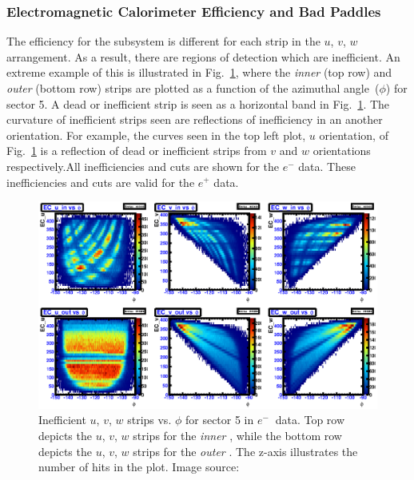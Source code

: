 \subsubsection{\label{sec:calib.ec.eff}Electromagnetic Calorimeter Efficiency and Bad Paddles}
The efficiency for the  subsystem is different for each strip in the $u$, $v$, $w$ arrangement. As a result, there are regions of detection which are inefficient. An extreme example of this is illustrated in Fig.~\ref{fig:neg:ec.sec5}, where the  \emph{inner} (top row) and \emph{outer} (bottom row) strips are plotted as a function of the azimuthal angle~($\phi$) for sector 5. A dead or inefficient strip is seen as a horizontal band in Fig.~\ref{fig:neg:ec.sec5}.  The curvature of inefficient strips seen are reflections of inefficiency in an another orientation. For example, the curves seen in the top left plot, $u$ orientation, of Fig.~\ref{fig:neg:ec.sec5} is a reflection of dead or inefficient strips from $v$ and $w$ orientations respectively.All inefficiencies and cuts are shown for the $e^-$ data. These inefficiencies and cuts are valid for the $e^+$ data.
%
\begin{figure}[h!]\begin{center}
\includegraphics[width=\figwidth,height=\hfigheight]{figures/calib/ec/pim_ecuvw_phi_NOKnockout_sec5.eps}
\caption[Inefficient  $u$, $v$, $w$ strips vs. $\phi$ for sector 5 in  $e^{-} \ $ data]{\label{fig:neg:ec.sec5}Inefficient  $u$, $v$, $w$ strips vs. $\phi$ for sector 5 in  $e^{-} \ $ data. Top row depicts the $u$, $v$, $w$ strips for the \emph{inner} , while the bottom row depicts the $u$, $v$, $w$ strips for the \emph{outer} . The z-axis illustrates the number of hits in the plot. Image source:~\cite{clas.thesis.kunkel}}
\end{center}\end{figure}
